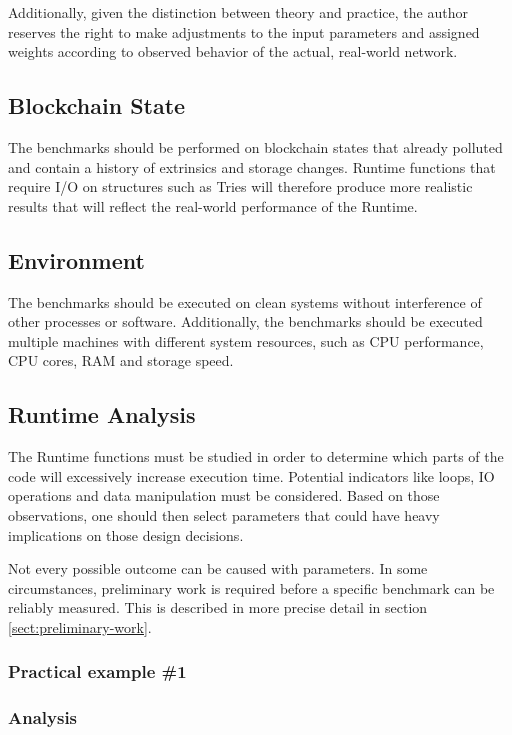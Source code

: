 \documentclass[11pt,a4paper]{article}
\begin{document}
Additionally, given the distinction between theory and practice, the author reserves the right
to make adjustments to the input parameters and assigned weights according to observed behavior
of the actual, real-world network.

\subsection{Blockchain State}
The benchmarks should be performed on blockchain states that already polluted and contain a history of
extrinsics and storage changes. Runtime functions that require I/O on structures
such as Tries will therefore produce more realistic results that will reflect the real-world
performance of the Runtime.

\subsection{Environment}
The benchmarks should be executed on clean systems without interference of other processes
or software. Additionally, the benchmarks should be executed multiple machines with different
system resources, such as CPU performance, CPU cores, RAM and storage speed.

\subsection{Runtime Analysis}
The Runtime functions must be studied in order to determine which parts of the code will excessively
increase execution time. Potential indicators like loops, IO operations and data manipulation must
be considered. Based on those observations, one should then select parameters that could have heavy
implications on those design decisions.
\newline

Not every possible outcome can be caused with parameters. In some circumstances, preliminary work
is required before a specific benchmark can be reliably measured. This is described in more precise
detail in section \ref{sect:preliminary-work}.

\subsubsection{Practical example \#1}

\subsubsection*{Analysis}
\end{document}
